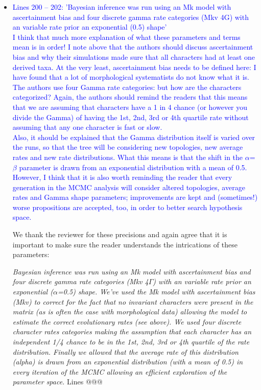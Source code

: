 \documentclass[12pt,letterpaper]{article}
\begin{document}
\begin{itemize}
\item{\textcolor{blue}{Lines 200 – 202: 'Bayesian inference was run using an Mk model with ascertainment bias and four discrete gamma rate categories (Mkv 4G) with an variable rate prior an exponential (0.5) shape'
\\
I think that much more explanation of what these parameters and terms mean is in order! I note above that the authors should discuss ascertainment bias and why their simulations made sure that all characters had at least one derived taxa. At the very least, ascertainment bias needs to be defined here: I have found that a lot of morphological systematists do not know what it is.
\\
The authors use four Gamma rate categories: but how are the characters categorized? Again, the authors should remind the readers that this means that we are assuming that characters have a 1 in 4 chance (or however you divide the Gamma) of having the 1st, 2nd, 3rd or 4th quartile rate without assuming that any one character is fast or slow.
\\
Also, it should be explained that the Gamma distribution itself is varied over the runs, so that the tree will be considering new topologies, new average rates and new rate distributions. What this means is that the shift in the $\alpha$=$\beta$ parameter is drawn from an exponential distribution with a mean of 0.5. However, I think that it is also worth reminding the reader that every generation in the MCMC analysis will consider altered topologies, average rates and Gamma shape parameters; improvements are kept and (sometimes!) worse propositions are accepted, too, in order to better search hypothesis space.}}

We thank the reviewer for these precisions and again agree that it is important to make sure the reader understands the intrications of these parameters:

\textit{Bayesian inference was run using an Mk model with ascertainment bias and four discrete gamma rate categories (Mkv 4$\Gamma$) with an variable rate prior an exponential ($\alpha$=0.5) shape. We've used the Mk model with ascertainment bias (Mkv) to correct for the fact that no invariant characters were present in the matrix (as is often the case with morphological data) allowing the model to estimate the correct evolutionary rates (see above). We used four discrete character rates categories making the assumption that each character has an independent 1/4 chance to be in the 1st, 2nd, 3rd or 4th quartile of the rate distribution. Finally we allowed that the average rate of this distribution (alpha) is drawn from an exponential distribution (with a mean of 0.5) in every iteration of the MCMC allowing an efficient exploration of the parameter space.} Lines @@@




\end{itemize}
\end{document}
